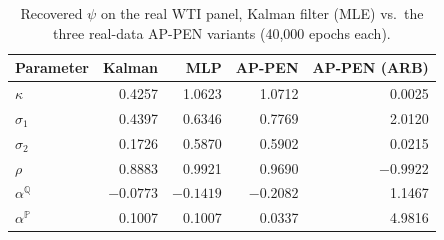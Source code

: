 \documentclass[11pt, a4paper]{article}
\begin{document}
%
%
%

\begin{table}[htbp]
\centering
\caption{Recovered $\psi$ on the real WTI panel, Kalman filter (MLE) vs.\ the
three real-data AP-PEN variants (40{,}000 epochs each).}
\label{tab:psi_real}
\begin{tabular}{@{}lrrrr@{}}
\toprule
Parameter & Kalman & MLP & AP-PEN & AP-PEN (ARB) \\
\midrule
$\kappa$              & 0.4257  & 1.0623  & 1.0712  & 0.0025 \\
$\sigma_1$            & 0.4397  & 0.6346  & 0.7769  & 2.0120 \\
$\sigma_2$            & 0.1726  & 0.5870  & 0.5902  & 0.0215 \\
$\rho$                & 0.8883  & 0.9921  & 0.9690  & $-0.9922$ \\
$\alpha^{\mathbb{Q}}$ & $-0.0773$ & $-0.1419$ & $-0.2082$ & 1.1467 \\
$\alpha^{\mathbb{P}}$ & 0.1007  & 0.1007  & 0.0337  & 4.9816 \\
\bottomrule
\end{tabular}
\end{table}
\end{document}
